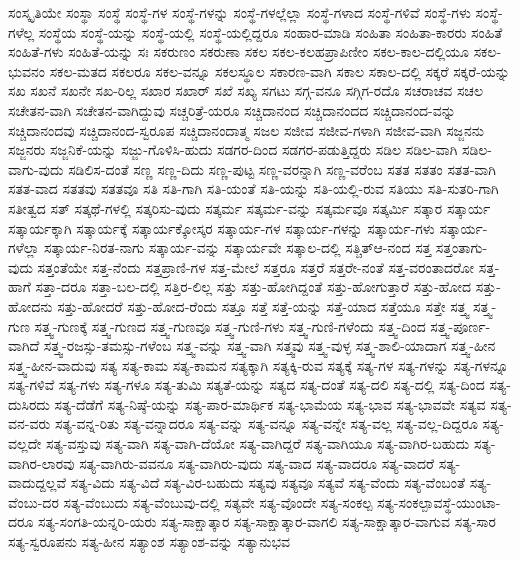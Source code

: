 {ಸಂಸ್ಕೃತಿಯೇ
ಸಂಸ್ಥಾ
ಸಂಸ್ಥೆ
ಸಂಸ್ಥೆ-ಗಳ
ಸಂಸ್ಥೆ-ಗಳನ್ನು
ಸಂಸ್ಥೆ-ಗಳಲ್ಲೆಲ್ಲಾ
ಸಂಸ್ಥೆ-ಗಳಾದ
ಸಂಸ್ಥೆ-ಗಳಿವೆ
ಸಂಸ್ಥೆ-ಗಳು
ಸಂಸ್ಥೆ-ಗಳೆಲ್ಲ
ಸಂಸ್ಥೆಯ
ಸಂಸ್ಥೆ-ಯನ್ನು
ಸಂಸ್ಥೆ-ಯಲ್ಲಿ
ಸಂಸ್ಥೆ-ಯಲ್ಲಿದ್ದರೂ
ಸಂಹಾರ-ಮಾಡಿ
ಸಂಹಿತಾ
ಸಂಹಿತಾ-ಕಾರರು
ಸಂಹಿತೆ
ಸಂಹಿತೆ-ಗಳು
ಸಂಹಿತೆ-ಯನ್ನು
ಸಃ
ಸಕರುಣಂ
ಸಕರುಣಾ
ಸಕಲ
ಸಕಲ-ಕಲಹಪ್ರಾಪಿಣೀಂ
ಸಕಲ-ಕಾಲ-ದಲ್ಲಿಯೂ
ಸಕಲ-ಭುವನಂ
ಸಕಲ-ಮತದ
ಸಕಲರೂ
ಸಕಲ-ವನ್ನೂ
ಸಕಲಸ್ಥೂಲ
ಸಕಾರಣ-ವಾಗಿ
ಸಕಾಲ
ಸಕಾಲ-ದಲ್ಲಿ
ಸಕ್ಕರೆ
ಸಕ್ಕರೆ-ಯನ್ನು
ಸಖ
ಸಖನೆ
ಸಖನೇ
ಸಖ-ರಿಲ್ಲ
ಸಖಾರ
ಸಖಾರ್
ಸಖೆ
ಸಖ್ಯ
ಸಗಟು
ಸಗ್ಗ-ವನೂ
ಸಗ್ಗಿಗ-ರದೊ
ಸಚರಾಚವ
ಸಚಲ
ಸಚೇತನ-ವಾಗಿ
ಸಚೇತನ-ವಾಗಿದ್ದುವು
ಸಚ್ಚರಿತ್ರೆ-ಯರೂ
ಸಚ್ಚಿದಾನಂದ
ಸಚ್ಚಿದಾನಂದದ
ಸಚ್ಚಿದಾನಂದ-ವನ್ನು
ಸಚ್ಚಿದಾನಂದವು
ಸಚ್ಚಿದಾನಂದ-ಸ್ವರೂಪ
ಸಚ್ಚಿದಾನಂದಾತ್ಮ
ಸಜಲ
ಸಜೀವ
ಸಜೀವ-ಗಳಾಗಿ
ಸಜೀವ-ವಾಗಿ
ಸಜ್ಜನನು
ಸಜ್ಜನರು
ಸಜ್ಜನಿಕೆ-ಯನ್ನು
ಸಜ್ಜು-ಗೊಳಿಸಿ-ಹುದು
ಸಡಗರ-ದಿಂದ
ಸಡಗರ-ಪಡುತ್ತಿದ್ದರು
ಸಡಿಲ
ಸಡಿಲ-ವಾಗಿ
ಸಡಿಲ-ವಾಗು-ವುದು
ಸಡಿಲಿಸ-ದಂತೆ
ಸಣ್ಣ
ಸಣ್ಣ-ದಿದು
ಸಣ್ಣ-ಪುಟ್ಟ
ಸಣ್ಣ-ವರನ್ನಾಗಿ
ಸಣ್ಣ-ವರೆಂಬ
ಸತತ
ಸತತಂ
ಸತತ-ವಾಗಿ
ಸತತ-ವಾದ
ಸತತವು
ಸತತವೂ
ಸತಿ
ಸತಿ-ಗಾಗಿ
ಸತಿ-ಯಂತೆ
ಸತಿ-ಯನ್ನು
ಸತಿ-ಯಲ್ಲಿ-ರುವ
ಸತಿಯು
ಸತಿ-ಸುತರಿ-ಗಾಗಿ
ಸತೀತ್ವದ
ಸತ್
ಸತ್ಕಥೆ-ಗಳಲ್ಲಿ
ಸತ್ಕರಿಸು-ವುದು
ಸತ್ಕರ್ಮ
ಸತ್ಕರ್ಮ-ವನ್ನು
ಸತ್ಕರ್ಮವೂ
ಸತ್ಕರ್ಮಿ
ಸತ್ಕಾರ
ಸತ್ಕಾರ್ಯ
ಸತ್ಕಾರ್ಯಕ್ಕಾಗಿ
ಸತ್ಕಾರ್ಯಕ್ಕೆ
ಸತ್ಕಾರ್ಯಕ್ಕೋಸ್ಕರ
ಸತ್ಕಾರ್ಯ-ಗಳ
ಸತ್ಕಾರ್ಯ-ಗಳನ್ನು
ಸತ್ಕಾರ್ಯ-ಗಳು
ಸತ್ಕಾರ್ಯ-ಗಳೆಲ್ಲಾ
ಸತ್ಕಾರ್ಯ-ನಿರತ-ನಾಗು
ಸತ್ಕಾರ್ಯ-ವನ್ನು
ಸತ್ಕಾರ್ಯವೇ
ಸತ್ಕಾಲ-ದಲ್ಲಿ
ಸತ್ಚಿತ್ಆ-ನಂದ
ಸತ್ತ
ಸತ್ತಂತಾಗು-ವುದು
ಸತ್ತಂತೆಯೇ
ಸತ್ತ-ನೆಂದು
ಸತ್ತಪ್ರಾಣಿ-ಗಳ
ಸತ್ತ-ಮೇಲೆ
ಸತ್ತರೂ
ಸತ್ತರೆ
ಸತ್ತರೇ-ನಂತೆ
ಸತ್ತ-ವರಂತಾದರೋ
ಸತ್ತ-ಹಾಗೆ
ಸತ್ತಾ-ದರೂ
ಸತ್ತಾ-ಬಲ-ದಲ್ಲಿ
ಸತ್ತಿರ-ಲಿಲ್ಲ
ಸತ್ತು
ಸತ್ತು-ಹೋಗಿದ್ದಂತೆ
ಸತ್ತು-ಹೋಗುತ್ತಾರೆ
ಸತ್ತು-ಹೋದ
ಸತ್ತು-ಹೋದನು
ಸತ್ತು-ಹೋದರೆ
ಸತ್ತು-ಹೋದ-ರೆಂದು
ಸತ್ತೂ
ಸತ್ತೆ
ಸತ್ತೆ-ಯನ್ನು
ಸತ್ತೆ-ಯಾದ
ಸತ್ತೆಯೂ
ಸತ್ತೇ
ಸತ್ತ್ವ
ಸತ್ತ್ವ-ಗುಣ
ಸತ್ತ್ವ-ಗುಣಕ್ಕೆ
ಸತ್ತ್ವ-ಗುಣದ
ಸತ್ತ್ವ-ಗುಣವೂ
ಸತ್ತ್ವ-ಗುಣಿ-ಗಳು
ಸತ್ತ್ವ-ಗುಣಿ-ಗಳೆಂದು
ಸತ್ತ್ವ-ದಿಂದ
ಸತ್ತ್ವ-ಪೂರ್ಣ-ವಾಗಿದೆ
ಸತ್ತ್ವ-ರಜಸ್ಸು-ತಮಸ್ಸು-ಗಳೆಂಬ
ಸತ್ತ್ವ-ವನ್ನು
ಸತ್ತ್ವ-ವಾಗಿ
ಸತ್ತ್ವವು
ಸತ್ತ್ವ-ವುಳ್ಳ
ಸತ್ತ್ವ-ಶಾಲಿ-ಯಾದಾಗ
ಸತ್ತ್ವ-ಹೀನ
ಸತ್ತ್ವ-ಹೀನ-ವಾದುವು
ಸತ್ಯ
ಸತ್ಯ-ಕಾಮ
ಸತ್ಯ-ಕಾಮನ
ಸತ್ಯಕ್ಕಾಗಿ
ಸತ್ಯಕ್ಕಿ-ರುವ
ಸತ್ಯಕ್ಕೆ
ಸತ್ಯ-ಗಳ
ಸತ್ಯ-ಗಳನ್ನು
ಸತ್ಯ-ಗಳನ್ನೂ
ಸತ್ಯ-ಗಳಿವೆ
ಸತ್ಯ-ಗಳು
ಸತ್ಯ-ಗಳೂ
ಸತ್ಯ-ತುಮಿ
ಸತ್ಯತೆ-ಯನ್ನು
ಸತ್ಯದ
ಸತ್ಯ-ದಂತೆ
ಸತ್ಯ-ದಲಿ
ಸತ್ಯ-ದಲ್ಲಿ
ಸತ್ಯ-ದಿಂದ
ಸತ್ಯ-ದುಸಿರದು
ಸತ್ಯ-ದೆಡೆಗೆ
ಸತ್ಯ-ನಿಷ್ಠೆ-ಯನ್ನು
ಸತ್ಯ-ಪಾರ-ಮಾರ್ಥಿಕ
ಸತ್ಯ-ಭಾಮೆಯ
ಸತ್ಯ-ಭಾವ
ಸತ್ಯ-ಭಾವವೇ
ಸತ್ಯವ
ಸತ್ಯ-ವನ-ವರು
ಸತ್ಯ-ವನ್ನ-ರಿತು
ಸತ್ಯ-ವನ್ನಾದರೂ
ಸತ್ಯ-ವನ್ನು
ಸತ್ಯ-ವನ್ನೂ
ಸತ್ಯ-ವನ್ನೇ
ಸತ್ಯ-ವಲ್ಲ
ಸತ್ಯ-ವಲ್ಲ-ದಿದ್ದರೂ
ಸತ್ಯ-ವಲ್ಲದೇ
ಸತ್ಯ-ವಸ್ತುವು
ಸತ್ಯ-ವಾಗಿ
ಸತ್ಯ-ವಾಗಿ-ದೆಯೋ
ಸತ್ಯ-ವಾಗಿದ್ದರೆ
ಸತ್ಯ-ವಾಗಿಯೂ
ಸತ್ಯ-ವಾಗಿರ-ಬಹುದು
ಸತ್ಯ-ವಾಗಿರ-ಲಾರವು
ಸತ್ಯ-ವಾಗಿರು-ವವನೂ
ಸತ್ಯ-ವಾಗಿರು-ವುದು
ಸತ್ಯ-ವಾದ
ಸತ್ಯ-ವಾದರೂ
ಸತ್ಯ-ವಾದರೆ
ಸತ್ಯ-ವಾದುದ್ದಲ್ಲವೆ
ಸತ್ಯ-ವಿದು
ಸತ್ಯ-ವಿದೆ
ಸತ್ಯ-ವಿರ-ಬಹುದು
ಸತ್ಯವು
ಸತ್ಯವೂ
ಸತ್ಯವೆ
ಸತ್ಯ-ವೆಂದು
ಸತ್ಯ-ವೆಂಬಂತೆ
ಸತ್ಯ-ವೆಂಬು-ದರ
ಸತ್ಯ-ವೆಂಬುದು
ಸತ್ಯ-ವೆಂಬುವು-ದಲ್ಲಿ
ಸತ್ಯವೇ
ಸತ್ಯ-ವೊಂದೇ
ಸತ್ಯ-ಸಂಕಲ್ಪ
ಸತ್ಯ-ಸಂಕಲ್ಪಾವಸ್ಥೆ-ಯುಂಟಾ-ದರೂ
ಸತ್ಯ-ಸಂಗತಿ-ಯನ್ನರಿ-ಯರು
ಸತ್ಯ-ಸಾಕ್ಷಾತ್ಕಾರ
ಸತ್ಯ-ಸಾಕ್ಷಾತ್ಕಾರ-ವಾಗಲಿ
ಸತ್ಯ-ಸಾಕ್ಷಾತ್ಕಾರ-ವಾಗುವ
ಸತ್ಯ-ಸಾರ
ಸತ್ಯ-ಸ್ವರೂಪನು
ಸತ್ಯ-ಹೀನ
ಸತ್ಯಾಂಶ
ಸತ್ಯಾಂಶ-ವನ್ನು
ಸತ್ಯಾನುಭವ
}
